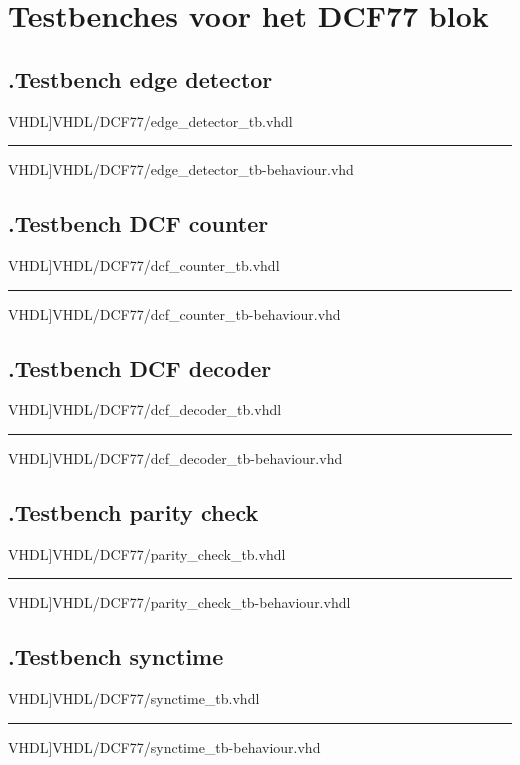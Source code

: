 \section{Testbenches voor het DCF77 blok}
\label{Ap: DCF_test}
\subsection*{\label{code: edge_detector_tb}\thesubsection.\quad Testbench edge detector}
\scriptsize 
 VHDL]{VHDL/DCF77/edge_detector_tb.vhdl}
\hrule
 VHDL]{VHDL/DCF77/edge_detector_tb-behaviour.vhd}
\normalsize

\subsection*{\label{code: dcf_counter_tb}\thesubsection.\quad Testbench DCF counter}
\scriptsize 
 VHDL]{VHDL/DCF77/dcf_counter_tb.vhdl}
\hrule
 VHDL]{VHDL/DCF77/dcf_counter_tb-behaviour.vhd}
\normalsize

\subsection*{\label{code: dcf_decoder_tb}\thesubsection.\quad Testbench DCF decoder}
\scriptsize 
 VHDL]{VHDL/DCF77/dcf_decoder_tb.vhdl}
\hrule
 VHDL]{VHDL/DCF77/dcf_decoder_tb-behaviour.vhd}
\normalsize

\subsection*{\label{code: parity_check_tb}\thesubsection.\quad Testbench parity check}
\scriptsize 
 VHDL]{VHDL/DCF77/parity_check_tb.vhdl}
\hrule
 VHDL]{VHDL/DCF77/parity_check_tb-behaviour.vhdl}
\normalsize

\subsection*{\label{code: synctime_tb}\thesubsection.\quad Testbench synctime}
\scriptsize 
 VHDL]{VHDL/DCF77/synctime_tb.vhdl}
\hrule
 VHDL]{VHDL/DCF77/synctime_tb-behaviour.vhd}
\normalsize

